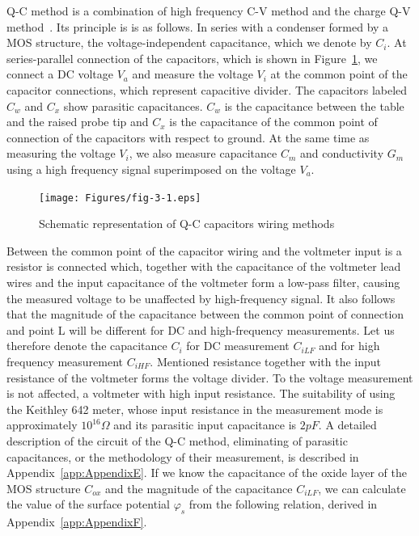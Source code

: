 Q-C method\cite{3.4} is a combination of high frequency C-V method and
the charge Q-V method~\cite{3.5}. Its principle is is as follows. In
series with a condenser formed by a MOS structure, the
voltage-independent capacitance, which we denote by $C_i$.  At
series-parallel connection of the capacitors, which is shown in
Figure~\ref{fig:3.1}, we connect a DC voltage $V_a$ and measure the
voltage $V_i$ at the common point of the capacitor connections, which
represent capacitive divider. The capacitors labeled $C_w$ and $C_x$
show parasitic capacitances. $C_w$ is the capacitance between the
table and the raised probe tip and $C_x$ is the capacitance of the
common point of connection of the capacitors with respect to
ground. At the same time as measuring the voltage $V_i$, we also
measure capacitance $C_m$ and conductivity $G_m$ using a high
frequency signal superimposed on the voltage $V_a$.

\begin{figure}[h!]\centering
  \texttt{[image: Figures/fig-3-1.eps]}%
  \caption[Schematic illustration of Q-C capacitor wiring
    methods]{Schematic representation of Q-C capacitors wiring
    methods}\label{fig:3.1}
\end{figure}

Between the common point of the capacitor wiring and the voltmeter
input is a resistor is connected which, together with the capacitance
of the voltmeter lead wires and the input capacitance of the voltmeter
form a low-pass filter, causing the measured voltage to be unaffected
by high-frequency signal. It also follows that the magnitude of the
capacitance between the common point of connection and point L will be
different for DC and high-frequency measurements. Let us therefore
denote the capacitance $C_i$ for DC measurement $C_{iLF}$ and for high
frequency measurement $C_{iHF}$.  Mentioned resistance together with
the input resistance of the voltmeter forms the voltage divider.  To
the voltage measurement is not affected, a voltmeter with high input
resistance.  The suitability of using the Keithley 642 meter, whose
input resistance in the measurement mode is approximately $10^{16}
\Omega$ and its parasitic input capacitance is $2 pF$. A detailed
description of the circuit of the Q-C method, eliminating of parasitic
capacitances, or the methodology of their measurement, is described in
Appendix~\ref{app:AppendixE}. If we know the capacitance of the oxide
layer of the MOS structure $C_{ox}$ and the magnitude of the
capacitance $C_{iLF}$, we can calculate the value of the surface
potential $\varphi_s$ from the following relation, derived in
Appendix~\ref{app:AppendixF}.


